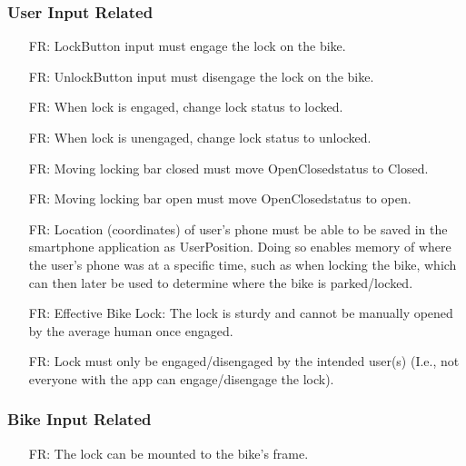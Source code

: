 \documentclass[12pt]{article}
\newcounter{reqnum} %
\newcounter{nfrnum} %
\begin{document}
\subsubsection{User Input Related}
\begin{itemize}
\setlength{\itemindent}{.5in}
\item[FR\refstepcounter{reqnum}\thereqnum\label{FR1}:] LockButton input must engage the lock on the bike.
\item[FR\refstepcounter{reqnum}\thereqnum\label{FR2}:] UnlockButton input must disengage the lock on the bike.
\item[FR\refstepcounter{reqnum}\thereqnum\label{FR3}:] When lock is engaged, change lock status to locked.
\item[FR\refstepcounter{reqnum}\thereqnum\label{FR4}:] When lock is unengaged, change lock status to unlocked.
\item[FR\refstepcounter{reqnum}\thereqnum\label{FR5}:] Moving locking bar closed must move OpenClosedstatus to Closed.
\item[FR\refstepcounter{reqnum}\thereqnum\label{FR6}:] Moving locking bar open must move OpenClosedstatus to open.
\item[FR\refstepcounter{reqnum}\thereqnum\label{FR7}:] Location (coordinates) of user’s phone must be able to be saved in the smartphone application as UserPosition. Doing so enables memory of where the user's phone was at a specific time, such as when locking the bike, which can then later be used to determine where the bike is parked/locked. 
\item[FR\refstepcounter{reqnum}\thereqnum\label{FR8}:] Effective Bike Lock: The lock is sturdy and cannot be manually  opened by the average human once engaged.
\item[FR\refstepcounter{reqnum}\thenfrnum\label{FR9}:] Lock must only be engaged/disengaged by the intended user(s) (I.e., not everyone with the app can engage/disengage the lock).
\end{itemize}

\subsubsection{Bike Input Related}
\begin{itemize}
\setlength{\itemindent}{.5in}
\item[FR\refstepcounter{reqnum}\thereqnum\label{FR10}:] The lock can be mounted to the bike's frame.
\end{itemize}
\end{document}
